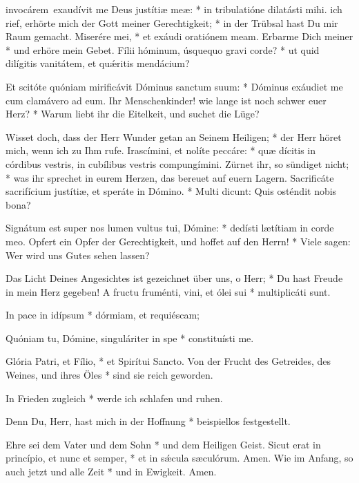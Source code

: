 \documentclass[fontsize=10pt,paper=A5,twoside,BCOR=1mm,DIV=21,headinclude]{scrarticle}
\begin{document}
\begin{paracol}{2} \pcb
\begin{psalmus}

 invocárem~exaudívit me Deus justítiæ meæ: * in tribulatióne dilatásti mihi.
	\switchcolumn
	 ich rief, erhörte mich der Gott meiner Gerechtigkeit; * in der Trübsal hast Du mir Raum gemacht.
\switchcolumn*
Miserére mei, * et exáudi oratiónem meam.
	\switchcolumn
	Erbarme Dich meiner * und erhöre mein Gebet.
\switchcolumn*
Fílii hóminum, úsquequo gravi corde? * ut quid dilígitis vanitátem, et quǽritis mendácium?

Et scitóte quóniam mirificávit Dóminus sanctum suum: * Dóminus exáudiet me cum clamávero ad eum.
	\switchcolumn
	Ihr Menschenkinder! wie lange ist noch schwer euer Herz? * Warum liebt ihr die Eitelkeit, und suchet die Lüge?

	Wisset doch, dass der Herr Wunder getan an Seinem Heiligen; * der Herr höret mich, wenn ich zu Ihm rufe.
\switchcolumn*
Irascímini, et nolíte peccáre: * quæ dícitis in córdibus vestris, in cubílibus vestris compungímini.
	\switchcolumn
	Zürnet ihr, so sündiget nicht; * was ihr sprechet in eurem Herzen, das bereuet auf euern Lagern.
\switchcolumn*
Sacrificáte sacrifícium justítiæ, et speráte in Dómino. * Multi dicunt: Quis osténdit nobis bona?

Signátum est super nos lumen vultus tui, Dómine: * dedísti lætítiam in corde meo.
	\switchcolumn
	Opfert ein Opfer der Gerechtigkeit, und hoffet auf den Herrn! * Viele sagen: Wer wird uns Gutes sehen lassen?

	Das Licht Deines Angesichtes ist gezeichnet über uns, o Herr; * Du hast Freude in mein Herz gegeben!
\switchcolumn*
A fructu fruménti, vini, et ólei sui * multiplicáti sunt.

In pace in idípsum * dórmiam, et requiéscam;

Quóniam tu, Dómine, singuláriter in spe * constituísti me.
	
Glória Patri, et Fílio, * et Spirítui Sancto.
	\switchcolumn
	Von der Frucht des Getreides, des Weines, und ihres Öles * sind sie reich geworden.

	In Frieden zugleich * werde ich schlafen und ruhen.

	Denn Du, Herr, hast mich in der Hoffnung * beispiellos festgestellt.

	Ehre sei dem Vater und dem Sohn * und dem Heiligen Geist.
\switchcolumn*
Sicut erat in princípio, et nunc et semper, * et in s\'æcula sæculórum. Amen.
	\switchcolumn
	Wie im Anfang, so auch jetzt und alle Zeit * und in Ewigkeit. Amen.
\end{psalmus}
\end{paracol}
\end{document}
